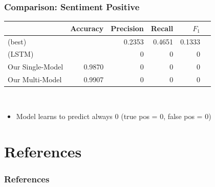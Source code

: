\documentclass[compress,aspectratio=169]{beamer} %
\begin{document}
\begin{frame}[fragile]
	\frametitle{Comparison: Sentiment Positive}
	\centering
	\begin{tabular}{l r r r r r}
		& Accuracy & Precision & Recall & $F_1$ \\
		\hline
		\cite{Schabus17} (best) & & 0.2353 & 0.4651 & 0.1333 \\
		\cite{Schabus17} (LSTM) & & 0 & 0 & 0\\
		\hline
		Our Single-Model & 0.9870 & 0 & 0 & 0 \\
		Our Multi-Model & 0.9907 & 0 & 0 & 0 \\
	\end{tabular}\\
	\vspace{5mm}
	\begin{itemize}
		\item Model learns to predict always 0 (true pos = 0, false pos = 0)
	\end{itemize}
\end{frame}


\section*{References}

\begin{frame}[t]%
	\frametitle{References}

	\tiny%
	
	
\end{frame}
\end{document}
